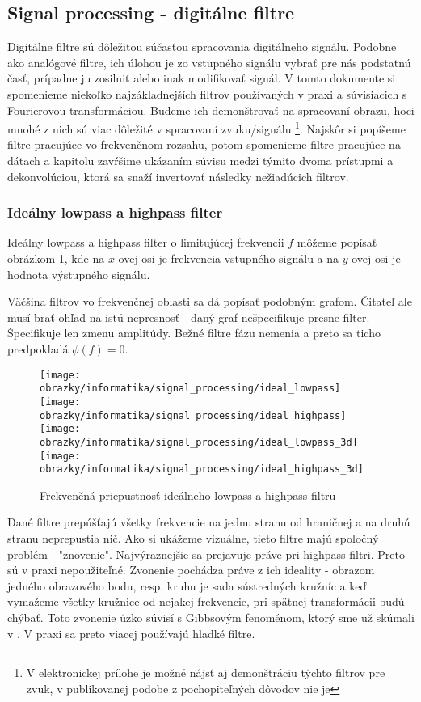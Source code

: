 \subsection{Signal processing - digitálne filtre}
Digitálne filtre sú dôležitou súčasťou spracovania digitálneho
signálu. Podobne ako analógové filtre, ich úlohou je zo vstupného
signálu vybrať pre nás podstatnú časť, prípadne ju zosilniť alebo inak
modifikovať signál. V tomto dokumente si spomenieme niekoľko 
najzákladnejších filtrov používaných v praxi a súvisiacich s Fourierovou
transformáciou. Budeme ich demonštrovať na spracovaní obrazu, hoci
mnohé z nich sú viac dôležité v spracovaní zvuku/signálu 
\footnote{V elektronickej prílohe je možné nájsť aj demonštráciu 
týchto filtrov pre zvuk, v publikovanej podobe z pochopiteľných
dôvodov nie je
}.
Najskôr si popíšeme filtre pracujúce vo frekvenčnom rozsahu, potom
spomenieme filtre pracujúce na  dátach a kapitolu
zavŕšime ukázaním súvisu medzi týmito dvoma prístupmi a
dekonvolúciou, ktorá sa snaží invertovať následky nežiadúcich filtrov.

\subsubsection{Ideálny lowpass a highpass filter}
Ideálny lowpass a highpass filter o limitujúcej frekvencii $f$ môžeme
popísať obrázkom \ref{fig:ideal_lowpass}, kde na $x$-ovej osi je frekvencia
vstupného signálu a na $y$-ovej osi je hodnota výstupného signálu.
\begin{poznamka}
    Väčšina filtrov vo frekvenčnej oblasti sa dá popísať podobným grafom.
    Čitaťeľ ale musí brať ohľad na istú nepresnosť - daný graf
    nešpecifikuje presne filter. Špecifikuje len zmenu amplitúdy.
    Bežné filtre fázu nemenia a preto sa ticho predpokladá $\phi(f)=0$.
\end{poznamka}

\begin{figure}[htp]
    \centering
    \texttt{[image: obrazky/informatika/signal\_processing/ideal\_lowpass]}
    \texttt{[image: obrazky/informatika/signal\_processing/ideal\_highpass]}
    \texttt{[image: obrazky/informatika/signal\_processing/ideal\_lowpass\_3d]}
    \texttt{[image: obrazky/informatika/signal\_processing/ideal\_highpass\_3d]}
    \caption{Frekvenčná priepustnosť ideálneho lowpass a highpass filtru}
    \label{fig:ideal_lowpass}
\end{figure}

Dané filtre prepúšťajú všetky frekvencie na jednu stranu od hraničnej
a na druhú stranu neprepustia nič. Ako si ukážeme vizuálne, tieto
filtre majú spoločný problém - "znovenie". Najvýraznejšie sa prejavuje
práve pri highpass filtri. Preto sú v praxi nepoužiteľné. Zvonenie
pochádza práve z ich ideality - obrazom jedného obrazového bodu, resp.
kruhu je sada sústredných kružníc a keď vymažeme všetky kružnice od
nejakej frekvencie, pri spätnej transformácii budú chýbať. Toto
zvonenie úzko súvisí s Gibbsovým fenoménom, ktorý sme už skúmali v
\todo{}. V praxi sa preto viacej používajú hladké filtre.

